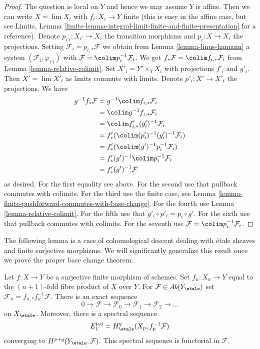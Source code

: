 \begin{proof}
The question is local on $Y$ and hence we may assume $Y$ is affine.
Then we can write $X = \lim X_i$ with $f_i : X_i \to Y$ finite
(this is easy in the affine case, but see
Limits, Lemma \ref{limits-lemma-integral-limit-finite-and-finite-presentation}
for a reference). Denote $p_{i'i} : X_{i'} \to X_i$
the transition morphisms and $p_i : X \to X_i$ the projections.
Setting $\mathcal{F}_i = p_{i, *}\mathcal{F}$ we obtain
from Lemma \ref{lemma-linus-hamann}
a system $(\mathcal{F}_i, \varphi_{i'i})$
with $\mathcal{F} = \colim p_i^{-1}\mathcal{F}_i$.
We get $f_*\mathcal{F} = \colim f_{i, *}\mathcal{F}_i$
from Lemma \ref{lemma-relative-colimit}.
Set $X'_i = Y' \times_Y X_i$ with projections $f'_i$ and $g'_i$.
Then $X' = \lim X'_i$ as limits commute with limits.
Denote $p'_i : X' \to X'_i$ the projections. We have
\begin{align*}
g^{-1}f_*\mathcal{F}
& =
g^{-1} \colim f_{i, *}\mathcal{F}_i \\
& =
\colim g^{-1}f_{i, *}\mathcal{F}_i \\
& =
\colim f'_{i, *}(g'_i)^{-1}\mathcal{F}_i \\
& =
f'_*(\colim (p'_i)^{-1}(g'_i)^{-1}\mathcal{F}_i) \\
& =
f'_*(\colim (g')^{-1}p_i^{-1}\mathcal{F}_i) \\
& =
f'_*(g')^{-1} \colim p_i^{-1}\mathcal{F}_i \\
& =
f'_*(g')^{-1}\mathcal{F}
\end{align*}
as desired. For the first equality see above.
For the second use that pullback commutes with colimits.
For the third use the finite case, see
Lemma \ref{lemma-finite-pushforward-commutes-with-base-change}.
For the fourth use Lemma \ref{lemma-relative-colimit}.
For the fifth use that $g'_i \circ p'_i = p_i \circ g'$.
For the sixth use that pullback commutes with colimits.
For the seventh use $\mathcal{F} = \colim p_i^{-1}\mathcal{F}_i$.
\end{proof}

\noindent
The following lemma is a case of cohomological descent dealing with
\'etale sheaves and finite surjective morphisms. We will significantly
generalize this result once we prove the proper base change theorem.

\begin{lemma}
\label{lemma-cohomological-descent-finite}
Let $f : X \to Y$ be a surjective finite morphism of schemes.
Set $f_n : X_n \to Y$ equal to the $(n + 1)$-fold fibre product
of $X$ over $Y$. For $\mathcal{F} \in \textit{Ab}(Y_\etale)$ set
$\mathcal{F}_n = f_{n, *}f_n^{-1}\mathcal{F}$. There is an exact
sequence
$$
0 \to \mathcal{F} \to \mathcal{F}_0 \to \mathcal{F}_1 \to
\mathcal{F}_2 \to \ldots
$$
on $X_\etale$. Moreover, there is a spectral sequence
$$
E_1^{p, q} = H^q_\etale(X_p, f_p^{-1}\mathcal{F})
$$
converging to $H^{p + q}(Y_\etale, \mathcal{F})$.
This spectral sequence is functorial in $\mathcal{F}$.
\end{lemma}


